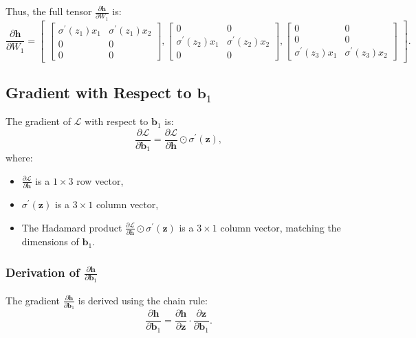 \begin{notechapter}
Thus, the full tensor \( \frac{\partial \mathbf{h}}{\partial W_1} \) is:
\[
\frac{\partial \mathbf{h}}{\partial W_1} = \begin{bmatrix}
\begin{bmatrix}
\sigma^{\prime}(z_1) x_1 & \sigma^{\prime}(z_1) x_2 \\
0 & 0 \\
0 & 0
\end{bmatrix},
\begin{bmatrix}
0 & 0 \\
\sigma^{\prime}(z_2) x_1 & \sigma^{\prime}(z_2) x_2 \\
0 & 0
\end{bmatrix},
\begin{bmatrix}
0 & 0 \\
0 & 0 \\
\sigma^{\prime}(z_3) x_1 & \sigma^{\prime}(z_3) x_2
\end{bmatrix}
\end{bmatrix}.
\]

\subsection{Gradient with Respect to \( \mathbf{b}_1 \)}

The gradient of \( \mathcal{L} \) with respect to \( \mathbf{b}_1 \) is:
\[
\frac{\partial \mathcal{L}}{\partial \mathbf{b}_1} = \frac{\partial \mathcal{L}}{\partial \mathbf{h}} 
\odot \sigma^{\prime}(\mathbf{z}),
\]
where:
\begin{itemize}
    \item \( \frac{\partial \mathcal{L}}{\partial \mathbf{h}} \) is a \( 1 \times 3 \) row vector,
    \item \( \sigma^{\prime}(\mathbf{z}) \) is a \( 3 \times 1 \) column vector,
    \item The Hadamard product \( \frac{\partial \mathcal{L}}{\partial \mathbf{h}} \odot \sigma^{\prime}(\mathbf{z}) \) 
          is a \( 3 \times 1 \) column vector, matching the dimensions of \( \mathbf{b}_1 \).
\end{itemize}

\subsubsection{Derivation of \( \frac{\partial \mathbf{h}}{\partial \mathbf{b}_1} \)}

The gradient \( \frac{\partial \mathbf{h}}{\partial \mathbf{b}_1} \) is derived using the chain rule:
\[
\frac{\partial \mathbf{h}}{\partial \mathbf{b}_1} = \frac{\partial \mathbf{h}}{\partial \mathbf{z}} \cdot \frac{\partial \mathbf{z}}{\partial \mathbf{b}_1}.
\]


\end{notechapter}
